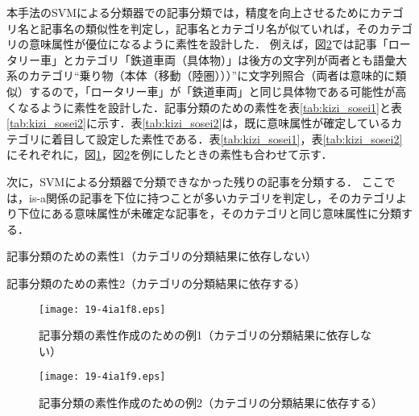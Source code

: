 \documentclass[japanese]{jnlp_1.4}
\begin{document}
\noindent
本手法のSVMによる分類器での記事分類では，精度を向上させるためにカテゴリ名と記事名の類似性を判定し，記事名とカテゴリ名が似ていれば，そのカテゴリの意味属性が優位になるように素性を設計した．
例えば，図\ref{fig:kizi_sosei2}では記事「ロータリー車」とカテゴリ「鉄道車両（具体物）」は後方の文字列が両者とも語彙大系のカテゴリ``乗り物（本体（移動（陸圏）））\inhibitglue''に文字列照合（両者は意味的に類似）するので，「ロータリー車」が「鉄道車両」と同じ具体物である可能性が高くなるように素性を設計した．記事分類のための素性を表\ref{tab:kizi_sosei1}と表\ref{tab:kizi_sosei2}に示す．表\ref{tab:kizi_sosei2}は，既に意味属性が確定しているカテゴリに着目して設定した素性である．表\ref{tab:kizi_sosei1}，表\ref{tab:kizi_sosei2}にそれぞれに，図\ref{fig:kizi_sosei1}，図\ref{fig:kizi_sosei2}を例にしたときの素性も合わせて示す．

次に，SVMによる分類器で分類できなかった残りの記事を分類する．
ここでは，is-a関係の記事を下位に持つことが多いカテゴリを判定し，そのカテゴリより下位にある意味属性が未確定な記事を，そのカテゴリと同じ意味属性に分類する．

\begin{table}[t]
\caption{記事分類のための素性1（カテゴリの分類結果に依存しない）}
\label{tab:kizi_sosei1}

\end{table}
\begin{table}[t]
\caption{記事分類のための素性2（カテゴリの分類結果に依存する）}
\label{tab:kizi_sosei2}

\end{table}

\begin{figure}[t]
\begin{center}
\texttt{[image: 19-4ia1f8.eps]}
\end{center}
\caption{記事分類の素性作成のための例1（カテゴリの分類結果に依存しない）}
\label{fig:kizi_sosei1}
\end{figure}
\begin{figure}[t]
\begin{center}
\texttt{[image: 19-4ia1f9.eps]}
\end{center}
\caption{記事分類の素性作成のための例2（カテゴリの分類結果に依存する）}
\label{fig:kizi_sosei2}
\end{figure}
\end{document}
